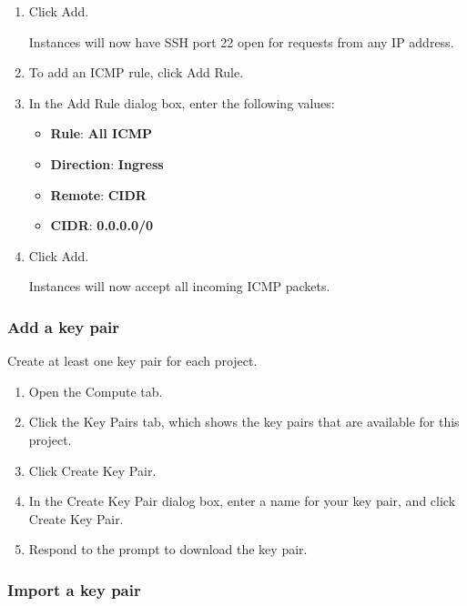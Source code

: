 {\begin{enumerate}
   To accept requests from a particular range of IP
  addresses, specify the IP address block in the CIDR box.

\item Click Add.

  Instances will now have SSH port 22 open for requests from any IP
  address.

\item To add an ICMP rule, click Add Rule.
\item In the Add Rule dialog box, enter the following values:

  \begin{itemize}
  \item \textbf{Rule}: \textbf{All ICMP}
  \item \textbf{Direction}: \textbf{Ingress}
  \item \textbf{Remote}: \textbf{CIDR}
  \item \textbf{CIDR}: \textbf{0.0.0.0/0}
  \end{itemize}

\item Click Add.

  Instances will now accept all incoming ICMP packets.
\end{enumerate}

\subsubsection{Add a key pair}\label{add-a-key-pair}
Create at least one key pair for each project.

\begin{enumerate}
\item Open the Compute tab.
\item Click the Key Pairs tab, which shows the key pairs that are
  available for this project.
\item Click Create Key Pair.
\item In the Create Key Pair dialog box, enter a name for your key
  pair, and click Create Key Pair.
\item Respond to the prompt to download the key pair.
  \end{enumerate}

\subsubsection{Import a key pair}\label{import-a-key-pair}

}

